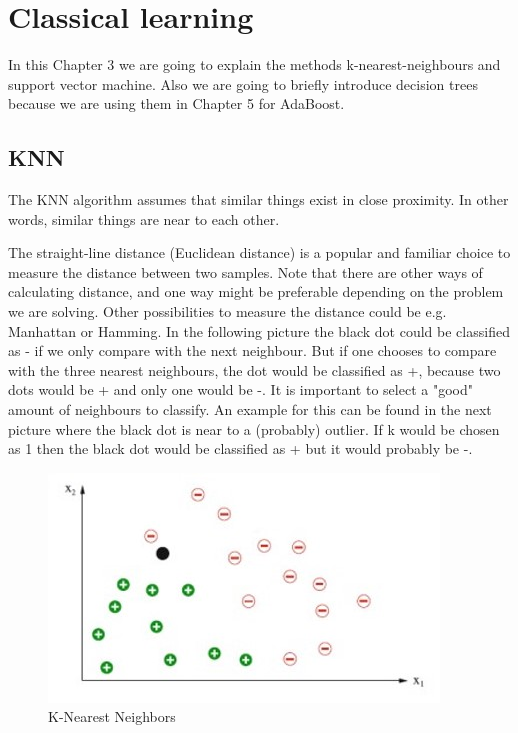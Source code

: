 \section{Classical learning}
In this Chapter 3 we are going to explain the methods k-nearest-neighbours and support vector machine. Also we are going to briefly introduce decision trees because we are using them in Chapter 5 for AdaBoost.


\subsection{KNN}
The KNN algorithm assumes that similar things exist in close proximity. In other words, similar things are near to each other.

The straight-line distance (Euclidean distance) is a popular and familiar choice to measure the distance between two samples.
Note that there are other ways of calculating distance, and one way might be preferable depending on the problem we are solving. Other possibilities to measure the distance could be e.g. Manhattan or Hamming.
In the following picture the black dot could be classified as - if we only compare with the next neighbour. But if one chooses to compare with the three nearest neighbours, the dot would be classified as +, because two dots would be + and only one would be -. It is important to select a "good" amount of neighbours to classify. An example for this can be found in the next picture where the black dot is near to a (probably) outlier. If k would be chosen as 1 then the black dot would be classified as + but it would probably be -.

\begin{figure}[hbtp]
	\centering
	\includegraphics[scale=0.8]{knn1}
	\caption{K-Nearest Neighbors}
	\label{fig:Datensatz - unbearbeitet}
\end{figure}

